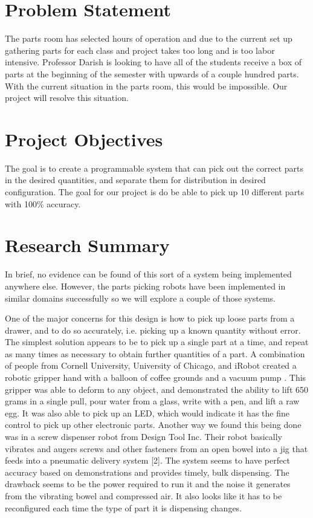 \documentclass[12pt]{report}
\begin{document}
\section*{Problem Statement}

The parts room has selected hours of operation and due to the current set up gathering parts for each class and project takes too long and is too labor intensive. Professor Darish is looking to have all of the students receive a box of parts at the beginning of the semester with upwards of a couple hundred parts. With the current situation in the parts room, this would be impossible. Our project will resolve this situation. 

\section*{Project Objectives}

The goal is to create a programmable system that can pick out the correct parts in the desired quantities, and separate them for distribution in desired configuration.  The goal for our project is do be able to pick up 10 different parts with 100\% accuracy. 

\section*{Research Summary}
In brief, no evidence can be found of this sort of a system being implemented anywhere else. However, the parts picking robots have been implemented in similar domains successfully so we will explore a couple of those systems. 
	
	
One of the major concerns for this design is how to pick up loose parts from a drawer, and to do so accurately, i.e. picking up a known quantity without error.  The simplest solution appears to be to pick up a single part at a time, and repeat as many times as necessary to obtain further quantities of a part.  A combination of people from Cornell University, University of Chicago, and iRobot created a robotic gripper hand with a balloon of coffee grounds and a vacuum pump \cite{vacumPickTool}.  This gripper was able to deform to any object, and demonstrated the ability to lift 650 grams in a single pull, pour water from a glass, write with a pen, and lift a raw egg.  It was also able to pick up an LED, which would indicate it has the fine control to pick up other electronic parts.  Another way we found this being done was in a screw dispenser robot from Design Tool Inc. Their robot basically vibrates and augers screws and other fasteners from an open bowel into a jig that feeds into a pneumatic delivery system [2]. The system seems to have perfect accuracy based on demonstrations and provides timely, bulk dispensing. The drawback seems to be the power required to run it and the noise it generates from the vibrating bowel and compressed air. It also looks like it has to be reconfigured each time the type of part it is dispensing changes.
\end{document}
